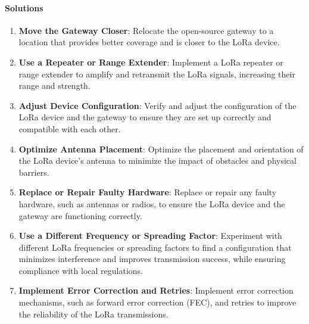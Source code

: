 \documentclass{article}
\begin{document}
\begin{enumerate}
\paragraph{Solutions}
\begin{enumerate}
    \item \textbf{Move the Gateway Closer}: Relocate the open-source gateway to a location that provides better coverage and is closer to the LoRa device.
    \item \textbf{Use a Repeater or Range Extender}: Implement a LoRa repeater or range extender to amplify and retransmit the LoRa signals, increasing their range and strength.
    \item \textbf{Adjust Device Configuration}: Verify and adjust the configuration of the LoRa device and the gateway to ensure they are set up correctly and compatible with each other.
    \item \textbf{Optimize Antenna Placement}: Optimize the placement and orientation of the LoRa device's antenna to minimize the impact of obstacles and physical barriers.
    \item \textbf{Replace or Repair Faulty Hardware}: Replace or repair any faulty hardware, such as antennas or radios, to ensure the LoRa device and the gateway are functioning correctly.
    \item \textbf{Use a Different Frequency or Spreading Factor}: Experiment with different LoRa frequencies or spreading factors to find a configuration that minimizes interference and improves transmission success, while ensuring compliance with local regulations.
    \item \textbf{Implement Error Correction and Retries}: Implement error correction mechanisms, such as forward error correction (FEC), and retries to improve the reliability of the LoRa transmissions.
\end{enumerate}

\end{enumerate}
\end{document}
